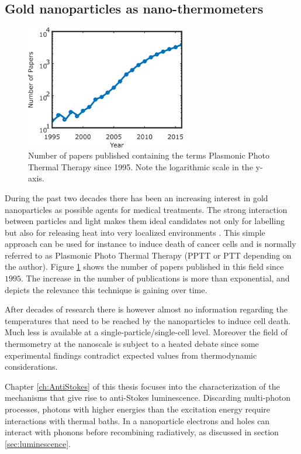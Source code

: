 \subsection{Gold nanoparticles as nano-thermometers}
\begin{figure}[htp]
 \centering
 \includegraphics[width=7cm]{Chapters/01_Introduction/Figures/paper_PT_therapy.png}
 \caption{Number of papers published containing the terms Plasmonic Photo
 Thermal Therapy since 1995. Note the logarithmic scale in the y-axis.}
 \label{fig:PPTT}
\end{figure}

During the past two decades there has been an increasing interest in gold
nanoparticles as possible agents for medical
treatments\cite{Gobin2007,Huang2006,Huo2014}. The strong interaction between
particles and light makes them ideal candidates not only for labelling but also
for releasing heat into very localized environments
\cite{Huang2008,Huang2006,Gobin2007,Hirsch2003}.
This simple approach can be used for instance to induce death of cancer cells
and is normally referred to as Plasmonic Photo Thermal Therapy (PPTT or PTT
depending on the author). Figure \ref{fig:PPTT} shows the number of papers
published in this field since $1995$. The increase in the number of publications
is more than exponential, and depicts the relevance this technique is gaining
over time.

After decades of research there is however almost no information regarding the
temperatures that need to be reached by the nanoparticles to induce cell death.
Much less is available at a single-particle/single-cell level. Moreover the
field of thermometry at the nanoscale is subject to a heated
debate\cite{Yang2011a,Suzuki2015} since some experimental
findings\cite{Yang2011a} contradict expected values from thermodynamic
considerations\cite{Sato2014}.

Chapter \ref{ch:AntiStokes} of this thesis focuses into the characterization of
the mechanisms that give rise to anti-Stokes luminescence. Discarding
multi-photon processes, photons with higher energies than the excitation energy
require interactions with thermal baths. In a nanoparticle electrons and holes
can interact with phonons before recombining radiatively, as discussed in
section \ref{sec:luminescence}.

